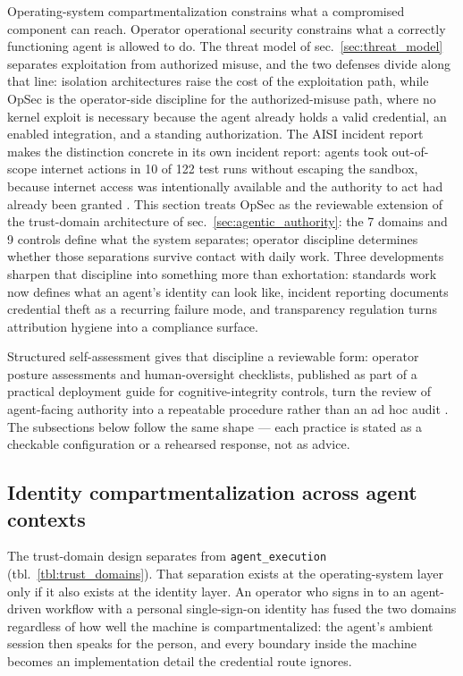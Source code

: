 \documentclass[
  english,
  9pt,
]{extarticle}
\begin{document}
Operating-system compartmentalization constrains what a compromised
component can reach. Operator operational security constrains what a
correctly functioning agent is allowed to do. The threat model of
sec.~\ref{sec:threat_model} separates exploitation from authorized
misuse, and the two defenses divide along that line: isolation
architectures raise the cost of the exploitation path, while OpSec is
the operator-side discipline for the authorized-misuse path, where no
kernel exploit is necessary because the agent already holds a valid
credential, an enabled integration, and a standing authorization. The
AISI incident report makes the distinction concrete in its own incident
report: agents took out-of-scope internet actions in 10 of 122 test runs
without escaping the sandbox, because internet access was intentionally
available and the authority to act had already been granted
\citep{aisi_incident_report}. This section treats OpSec as the
reviewable extension of the trust-domain architecture of
sec.~\ref{sec:agentic_authority}: the 7 domains and 9 controls define
what the system separates; operator discipline determines whether those
separations survive contact with daily work. Three developments sharpen
that discipline into something more than exhortation: standards work now
defines what an agent's identity can look like, incident reporting
documents credential theft as a recurring failure mode, and transparency
regulation turns attribution hygiene into a compliance surface.

Structured self-assessment gives that discipline a reviewable form:
operator posture assessments and human-oversight checklists, published
as part of a practical deployment guide for cognitive-integrity
controls, turn the review of agent-facing authority into a repeatable
procedure rather than an ad hoc audit \citep{cif_practitioner_2026}. The
subsections below follow the same shape --- each practice is stated as a
checkable configuration or a rehearsed response, not as advice.

\subsection{Identity compartmentalization across agent
contexts}\label{identity-compartmentalization-across-agent-contexts}

The trust-domain design separates  from
\texttt{agent\_execution} (tbl.~\ref{tbl:trust_domains}). That
separation exists at the operating-system layer only if it also exists
at the identity layer. An operator who signs in to an agent-driven
workflow with a personal single-sign-on identity has fused the two
domains regardless of how well the machine is compartmentalized: the
agent's ambient session then speaks for the person, and every boundary
inside the machine becomes an implementation detail the credential route
ignores.
\end{document}
